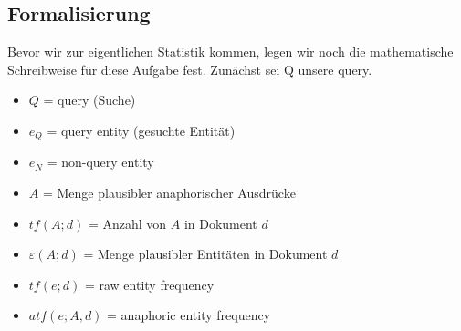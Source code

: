 \subsection{Formalisierung}
Bevor wir zur eigentlichen Statistik kommen, legen wir noch die mathematische Schreibweise für diese Aufgabe fest.
Zunächst sei Q unsere query. 

 \begin{itemize}
	\item $Q$ = query (Suche)
	\item $e_Q$ = query entity (gesuchte Entität)
	\item $e_N$ = non-query entity
	\item $A$ = Menge plausibler anaphorischer Ausdrücke
	\item $tf(A;d)$ = Anzahl von $A$ in Dokument $d$
	\item $\varepsilon (A;d)$ = Menge plausibler Entitäten in Dokument $d$
	\item $tf(e;d)$ = raw entity frequency
	\item $atf(e;A,d)$ = anaphoric entity frequency
  \end{itemize}
